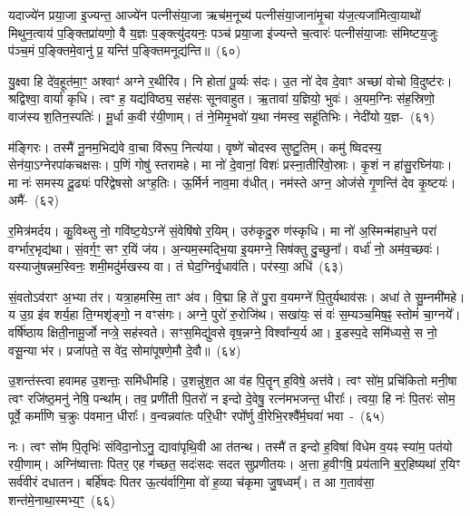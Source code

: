 यदाज्ये॑न प्रया॒जा इ॒ज्यन्त॒ आज्ये॑न पत्नीसंया॒जा ऋच॑म॒नूच्य॑ पत्नीसंया॒जाना॑मृ॒चा य॑ज॒त्यजा॑मित्वा॒याथो॑ मिथुन॒त्वाय॑ प॒ङ्क्तिप्रा॑यणो॒ वै य॒ज्ञः प॒ङ्क्त्यु॑दयनः॒ पञ्च॑ प्रया॒जा इ॑ज्यन्ते च॒त्वारः॑ पत्नीसंया॒जाः स॑मिष्टय॒जुः प॑ञ्च॒मं प॒ङ्क्तिमे॒वानु॑ प्र॒ यन्ति॑ प॒ङ्क्तिमनूद्य॑न्ति॥~(६०)

{\anuvakamend[{प्र॒जायाः᳚ करोति॒ तत्क्रि॑यते॒ त्रय॑स्त्रिꣳशच्च}]}%

यु॒क्ष्वा हि दे॑व॒हूत॑मा॒ꣳ॒ अश्वाꣳ॑ अग्ने र॒थीरि॑व। नि होता॑ पू॒र्व्यः स॑दः। उ॒त नो॑ देव दे॒वाꣳ अच्छा॑ वोचो वि॒दुष्ट॑रः। श्रद्विश्वा॒ वार्या॑ कृधि। त्वꣳ ह॒ यद्य॑विष्ठ्य॒ सह॑सः सूनवाहुत। ऋ॒तावा॑ य॒ज्ञियो॒ भुवः॑। अ॒यम॒ग्निः स॑ह॒स्रिणो॒ वाज॑स्य श॒तिन॒स्पतिः॑। मू॒र्धा क॒वी र॑यी॒णाम्। तं ने॒मिमृ॒भवो॑ य॒था न॑मस्व॒ सहू॑तिभिः। नेदी॑यो य॒ज्ञ-~(६१)

म॑ङ्गिरः। तस्मै॑ नू॒नम॒भिद्य॑वे वा॒चा वि॑रूप॒ नित्य॑या। वृष्णे॑ चोदस्व सुष्टु॒तिम्। कमु॑ ष्विदस्य॒ सेन॑या॒\-ऽग्नेरपा॑कचक्षसः। प॒णिं गोषु॑ स्तरामहे। मा नो॑ दे॒वानां॒ विशः॑ प्रस्ना॒तीरि॑वो॒स्राः। कृ॒शं न हा॑सु॒रघ्नि॑याः। मा नः॑ समस्य दू॒ढ्यः॑ परि॑द्वेषसो अꣳह॒तिः। ऊ॒र्मिर्न नाव॒मा व॑धीत्। नम॑स्ते अग्न॒ ओज॑से गृ॒णन्ति॑ देव कृ॒ष्टयः॑। अमै॑-~(६२)

र॒मित्र॑मर्दय। कु॒विथ्सु नो॒ गवि॑ष्ट॒ये\-ऽग्ने॑ सं॒वेषि॑षो र॒यिम्। उरु॑कृदु॒रु ण॑स्कृधि। मा नो॑ अ॒स्मिन्म॑हाध॒ने परा॑ वर्ग्भार॒भृद्य॑था। सं॒वर्ग॒ꣳ॒ सꣳ र॒यिं ज॑य। अ॒न्यम॒स्मद्भि॒या इ॒यमग्ने॒ सिष॑क्तु दु॒च्छुना᳚। वर्धा॑ नो॒ अम॑व॒च्छवः॑। यस्याजु॑षन्नम॒स्विनः॒ शमी॒मदु॑र्मखस्य वा। तं घेद॒ग्निर्वृ॒धाव॑ति। पर॑स्या॒ अधि॑~(६३)

सं॒वतो\-ऽव॑राꣳ अ॒भ्या त॑र। यत्रा॒हमस्मि॒ ताꣳ अ॑व। वि॒द्मा हि ते॑ पु॒रा व॒यमग्ने॑ पि॒तुर्यथाव॑सः। अधा॑ ते सु॒म्नमी॑महे। य उ॒ग्र इ॑व शर्य॒हा ति॒ग्मशृ॑ङ्गो॒ न वꣳस॑गः। अग्ने॒ पुरो॑ रु॒रोजि॑थ। सखा॑यः॒ सं वः॑ स॒म्यञ्च॒मिष॒ꣴ॒ स्तोमं॑ चा॒ग्नये᳚। वर्\mbox{}षि॑ष्ठाय क्षिती॒नामू॒र्जो नप्त्रे॒ सह॑\-स्वते। सꣳस॒मिद्यु॑वसे वृष॒न्नग्ने॒ विश्वा᳚न्य॒र्य आ। इ॒डस्प॒दे समि॑ध्यसे॒ स नो॒ वसू॒न्या भ॑र। प्रजा॑पते॒ स वे॑द॒ सोमा॑पूषणे॒मौ दे॒वौ॥~(६४)

{\anuvakamend[{य॒ज्ञममै॒रधि॑ वृष॒न्नेका॒न्नविꣳ॑श॒तिश्च॑}]}%

उ॒शन्त॑स्त्वा हवामह उ॒शन्तः॒ समि॑धीमहि। उ॒शन्नु॑श॒त आ व॑ह पि॒तॄन् ह॒विषे॒ अत्त॑वे। त्वꣳ सो॑म॒ प्रचि॑कितो मनी॒षा त्वꣳ रजि॑ष्ठ॒मनु॑ नेषि॒ पन्था᳚म्। तव॒ प्रणी॑ती पि॒तरो॑ न इन्दो दे॒वेषु॒ रत्न॑मभजन्त॒ धीराः᳚। त्वया॒ हि नः॑ पि॒तरः॑ सोम॒ पूर्वे॒ कर्मा॑णि च॒क्रुः प॑वमान॒ धीराः᳚। व॒न्वन्नवा॑तः परि॒धीꣳ रपो᳚र्णु वी॒रेभि॒रश्वै᳚र्म॒घवा॑ भवा~-~(६५)

नः। त्वꣳ सो॑म पि॒तृभिः॑ संविदा॒नो\-ऽनु॒ द्यावा॑\-पृथि॒वी आ त॑तन्थ। तस्मै॑ त इन्दो ह॒विषा॑ विधेम व॒यꣴ स्या॑म॒ पत॑यो रयी॒णाम्। अग्नि॑ष्वात्ताः पितर॒ एह ग॑च्छत॒ सदः॑सदः सदत सुप्रणीतयः। अ॒त्ता ह॒वीꣳषि॒ प्रय॑तानि ब॒र्॒\mbox{}हिष्यथा॑ र॒यिꣳ सर्व॑वीरं दधातन। बर्\mbox{}हि॑षदः पितर ऊ॒त्य॑र्वागि॒मा वो॑ ह॒व्या च॑कृमा जु॒षध्वम्᳚। त आ ग॒ताव॑सा॒ शन्त॑मे॒नाथा॒स्मभ्य॒ꣳ॒~(६६)

